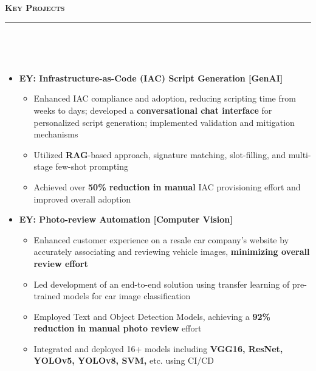 \documentclass[a4paper,10pt]{article}
\newcommand{\isep}{-2 pt}
\newcommand{\lsep}{-0.5cm}
\newcommand{\resheading}[1]{{\small
        {
            \begin{minipage}
                {0.992\textwidth}\textbf{{\textsc{#1 \vphantom{p\^{E}} }}}
                \\[-0.3cm]
                \hrule
            \end{minipage}
            \\[-0.5cm]
        }
 }}
\begin{document}
\vspace{2pt}
\noindent
\resheading{\textbf{\large Key Projects}}\\[\lsep] 
\vspace{4pt}
\begin{itemize}
\item \textbf{EY: Infrastructure-as-Code (IAC) Script Generation [GenAI]}  
\\[-0.6cm]
    \begin{itemize}\itemsep \isep
        \item Enhanced IAC compliance and adoption, reducing scripting time from weeks to days; developed a \textbf{conversational chat interface} for personalized script generation; implemented validation and mitigation mechanisms
        \item Utilized \textbf{RAG}-based approach, signature matching, slot-filling, and multi-stage few-shot prompting
        \item Achieved over \textbf{50\% reduction in manual} IAC provisioning effort and improved overall adoption
    \end{itemize}

\item \textbf{EY: Photo-review Automation [Computer Vision]} 
\\[-0.6cm]
    \begin{itemize}\itemsep \isep
        \item Enhanced customer experience on a resale car company's website by accurately associating and reviewing vehicle images, \textbf{minimizing overall review effort}

        \item Led development of an end-to-end solution using transfer learning of pre-trained models for car image classification
        
        \item Employed Text and Object Detection Models, achieving a \textbf{92\% reduction in manual photo review} effort
        
        \item Integrated and deployed 16+ models including \textbf{VGG16, ResNet, YOLOv5, YOLOv8, SVM,} etc. using CI/CD
    \end{itemize}
    

\end{itemize}
\end{document}
